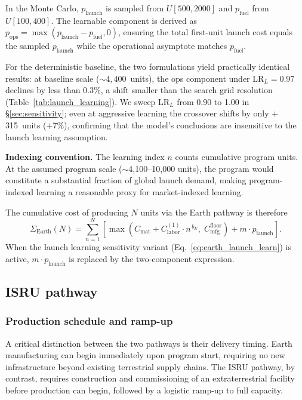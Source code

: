 \documentclass[preprint,12pt]{elsarticle}
\begin{document}
In the Monte Carlo, $p_{\mathrm{launch}}$ is sampled from $U[500, 2000]$ and $p_{\mathrm{fuel}}$ from $U[100, 400]$. The learnable component is derived as $p_{\mathrm{ops}} = \max(p_{\mathrm{launch}} - p_{\mathrm{fuel}}, 0)$, ensuring the total first-unit launch cost equals the sampled $p_{\mathrm{launch}}$ while the operational asymptote matches $p_{\mathrm{fuel}}$.

For the deterministic baseline, the two formulations yield practically identical results: at baseline scale (${\sim}4{,}400$~units), the ops component under $\mathrm{LR}_L = 0.97$ declines by less than 0.3\%, a shift smaller than the search grid resolution (Table~\ref{tab:launch_learning}). We sweep $\mathrm{LR}_L$ from 0.90 to 1.00 in \S\ref{sec:sensitivity}; even at aggressive learning the crossover shifts by only $+$315~units ($+$7\%), confirming that the model's conclusions are insensitive to the launch learning assumption.

\textbf{Indexing convention.} The learning index $n$ counts cumulative program units. At the assumed program scale ($\sim$4{,}100--10{,}000 units), the program would constitute a substantial fraction of global launch demand, making program-indexed learning a reasonable proxy for market-indexed learning.

The cumulative cost of producing $N$ units via the Earth pathway is therefore
\begin{equation}
  \Sigma_{\mathrm{Earth}}(N) = \sum_{n=1}^{N} \left[ \max\!\left(C_{\mathrm{mat}} + C_{\mathrm{labor}}^{(1)} \cdot n^{\,b_E},\; C_{\mathrm{mfg}}^{\mathrm{floor}}\right) + m \cdot p_{\mathrm{launch}} \right].
  \label{eq:earth_cum}
\end{equation}
When the launch learning sensitivity variant (Eq.~\ref{eq:earth_launch_learn}) is active, $m \cdot p_{\mathrm{launch}}$ is replaced by the two-component expression.

\subsection{ISRU pathway}

\subsubsection{Production schedule and ramp-up}

A critical distinction between the two pathways is their delivery timing. Earth manufacturing can begin immediately upon program start, requiring no new infrastructure beyond existing terrestrial supply chains. The ISRU pathway, by contrast, requires construction and commissioning of an extraterrestrial facility before production can begin, followed by a logistic ramp-up to full capacity.
\end{document}
